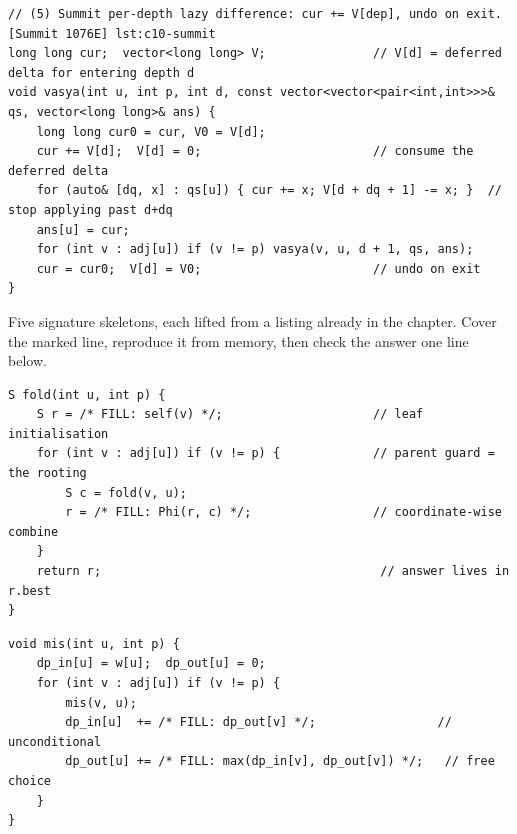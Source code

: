 \begin{lstlisting}[caption={Chapter 13 code kit: the tuple fold, the in/out pair, the peak-harvest merge, the two depth-histogram shapes, and the Summit's per-depth lazy difference}, label={lst:c10-kit}]
// (5) Summit per-depth lazy difference: cur += V[dep], undo on exit. [Summit 1076E] lst:c10-summit
long long cur;  vector<long long> V;               // V[d] = deferred delta for entering depth d
void vasya(int u, int p, int d, const vector<vector<pair<int,int>>>& qs, vector<long long>& ans) {
    long long cur0 = cur, V0 = V[d];
    cur += V[d];  V[d] = 0;                        // consume the deferred delta
    for (auto& [dq, x] : qs[u]) { cur += x; V[d + dq + 1] -= x; }  // stop applying past d+dq
    ans[u] = cur;
    for (int v : adj[u]) if (v != p) vasya(v, u, d + 1, qs, ans);
    cur = cur0;  V[d] = V0;                        // undo on exit
}
\end{lstlisting}


Five signature skeletons, each lifted from a listing already in the
chapter. Cover the marked line, reproduce it from memory, then check the
answer one line below.

\begin{lstlisting}[caption={Drill 1 -- the subtree tuple fold (from \coderef{c10-fold})}]
S fold(int u, int p) {
    S r = /* FILL: self(v) */;                     // leaf initialisation
    for (int v : adj[u]) if (v != p) {             // parent guard = the rooting
        S c = fold(v, u);
        r = /* FILL: Phi(r, c) */;                 // coordinate-wise combine
    }
    return r;                                       // answer lives in r.best
}
\end{lstlisting}

\begin{lstlisting}[caption={Drill 2 -- the in/out pair recurrence (from \coderef{c10-inout})}]
void mis(int u, int p) {
    dp_in[u] = w[u];  dp_out[u] = 0;
    for (int v : adj[u]) if (v != p) {
        mis(v, u);
        dp_in[u]  += /* FILL: dp_out[v] */;                 // unconditional
        dp_out[u] += /* FILL: max(dp_in[v], dp_out[v]) */;   // free choice
    }
}
\end{lstlisting}


